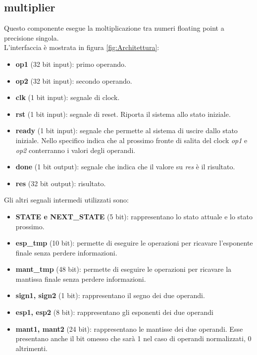 \documentclass[]{IEEEtran}
\begin{document}
\subsection{multiplier}
Questo componente esegue la moltiplicazione tra numeri floating point a precisione singola.
\\L'interfaccia è mostrata in figura \ref{fig:Architettura}:
\begin{itemize}
    \item \textbf{op1} (32 bit input): primo operando.
    \item \textbf{op2} (32 bit input): secondo operando.
    \item \textbf{clk} (1 bit input): segnale di clock.
    \item \textbf{rst} (1 bit input): segnale di reset. Riporta il sistema allo stato iniziale.
    \item \textbf{ready} (1 bit input): segnale che permette al sistema di uscire dallo stato iniziale. Nello specifico indica che al prossimo fronte di salita del clock \textit{op1} e \textit{op2} conterranno i valori degli operandi.
    \item \textbf{done} (1 bit output): segnale che indica che il valore su \textit{res} è il risultato.
    \item \textbf{res} (32 bit output): risultato.
\end{itemize}

Gli altri segnali intermedi utilizzati sono:
\begin{itemize}
    \item \textbf{STATE e NEXT\_STATE} (5 bit): rappresentano lo stato attuale e lo stato prossimo.
    \item \textbf{esp\_tmp} (10 bit): permette di eseguire le operazioni per ricavare l'esponente finale senza perdere informazioni.
    \item \textbf{mant\_tmp} (48 bit): permette di eseguire le operazioni per ricavare la mantissa finale senza perdere informazioni.
    \item \textbf{sign1, sign2} (1 bit): rappresentano il segno dei due operandi.
    \item \textbf{esp1, esp2} (8 bit): rappresentano gli esponenti dei due operandi
    \item \textbf{mant1, mant2} (24 bit): rappresentano le mantisse dei due operandi. Esse presentano anche il bit omesso che sarà 1 nel caso di operandi normalizzati, 0 altrimenti.
\end{itemize}
\end{document}

